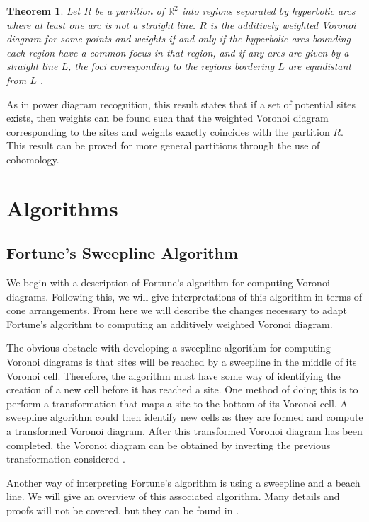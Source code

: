 \documentclass[a4paper, 11pt]{article}
\newtheorem{theorem}{Theorem}[section]
\newcommand{\R}{\mathbb{R}}
\begin{document}
\begin{theorem}
  \label{thm:add_rec}
  Let $R$ be a partition of $\R^2$ into regions separated by hyperbolic arcs where at least one arc is not a straight line. $R$ is the additively
  weighted Voronoi diagram for some points and weights if and only if the hyperbolic arcs bounding each region have a common focus in that region, and
  if any arcs are given by a straight line $L$, the foci corresponding to the regions bordering $L$ are equidistant from $L$ \cite{ash-bolker}.
\end{theorem}

As in power diagram recognition, this result states that if a set of potential sites exists, then weights can be found such that the weighted Voronoi
diagram corresponding to the sites and weights exactly coincides with the partition $R$. This result can be proved for more general partitions through
the use of cohomology.

\section{Algorithms}

\subsection{Fortune's Sweepline Algorithm}

We begin with a description of Fortune's algorithm for computing Voronoi diagrams. Following this, we will give interpretations of this algorithm in
terms of cone arrangements. From here we will describe the changes necessary to adapt Fortune's algorithm to computing an additively weighted Voronoi
diagram.

The obvious obstacle with developing a sweepline algorithm for computing Voronoi diagrams is that sites will be reached by a sweepline in the middle
of its Voronoi cell. Therefore, the algorithm must have some way of identifying the creation of a new cell before it has reached a site. One method of
doing this is to perform a transformation that maps a site to the bottom of its Voronoi cell. A sweepline algorithm could then identify new cells as
they are formed and compute a transformed Voronoi diagram. After this transformed Voronoi diagram has been completed, the Voronoi diagram can be
obtained by inverting the previous transformation considered \cite{fortune_sweepline}.

Another way of interpreting Fortune's algorithm is using a sweepline and a beach line. We will give an overview of this associated algorithm. Many
details and proofs will not be covered, but they can be found in \cite{comp_geom}.
\end{document}
